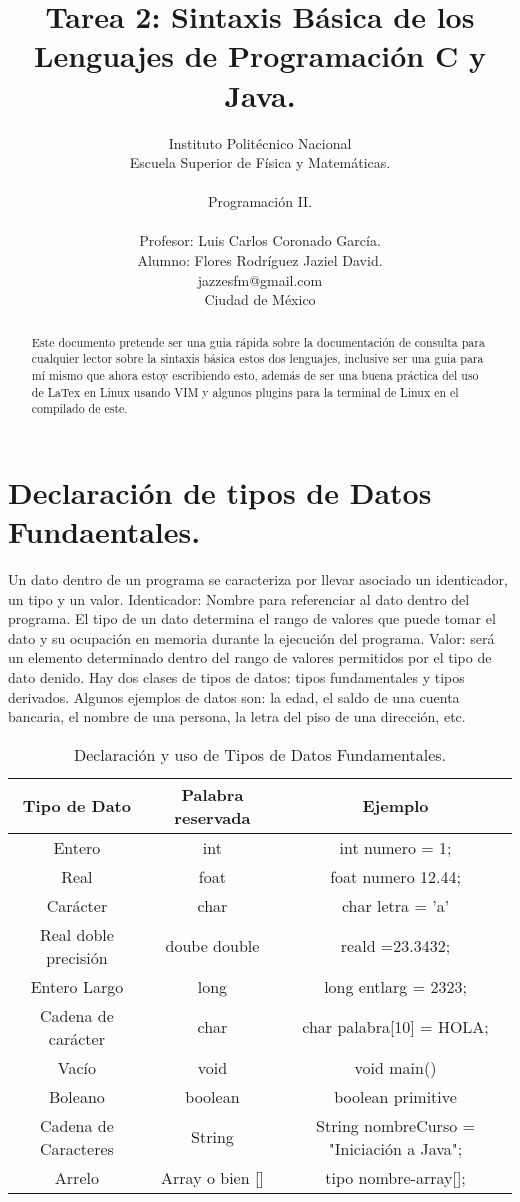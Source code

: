 \documentclass[a4paper]{article}
\title{Tarea 2: Sintaxis Básica de los Lenguajes de Programación C y Java.}
\author{Instituto Politécnico Nacional\\
        Escuela Superior de Física y Matemáticas. \\
        \\
        Programación II. \\ \\
        Profesor: Luis Carlos Coronado García.\\
        Alumno: Flores Rodríguez Jaziel David. \\
  \small jazzesfm@gmail.com\\
  \small Ciudad de México
  \date{}
}
\begin{document}
\maketitle
\begin{abstract}
Este documento pretende ser una guia rápida sobre la documentación de consulta para cualquier lector sobre la sintaxis básica estos dos lenguajes, inclusive ser una guia para mí mismo que ahora estoy escribiendo esto, además de ser una buena práctica del uso de LaTex en Linux usando VIM y algunos plugins para la terminal de Linux en el compilado de este. 
\end{abstract}
 
\section{Declaración de tipos de Datos Fundaentales.}
Un dato dentro de un programa se caracteriza por llevar asociado un identicador, un tipo y
un valor. Identicador: Nombre para referenciar al dato dentro del programa. El tipo de un dato determina el rango de valores que puede tomar el dato y su ocupación en memoria durante la ejecución del programa. Valor: será un elemento determinado dentro del rango de valores permitidos por el tipo de dato denido. Hay dos clases de tipos de datos: tipos fundamentales y tipos derivados. Algunos ejemplos de datos son: la edad, el saldo de una cuenta bancaria, el nombre de una persona, la letra del piso de una dirección, etc.\\ 

\begin{table}[H]
\cetering

	\begin{tabular}{ c | c | c }
Tipo de Dato & Palabra reservada & Ejemplo \\ \hline
Entero &  int &  int numero = 1; \\ \hline
Real & foat & foat numero 12.44; \\ \hline
Carácter & char & char letra = 'a'\\ \hline
Real doble precisión & doube double & reald =23.3432; \\ \hline
Entero Largo & long & long entlarg = 2323; \\ \hline
Cadena de carácter & char & char palabra[10] = HOLA; \\ \hline		
Vacío & void &  void main() \\ \hline
Boleano & boolean & boolean primitive \\ \hline
Cadena de Caracteres & String & String nombreCurso = "Iniciación a Java"; \\ \hline
Arrelo & Array o bien [] & tipo nombre-array[]; \\ \hline 

	\end{tabular} 
\caption{Declaración y uso de Tipos de Datos Fundamentales.}
\end{table}
\end{document}
